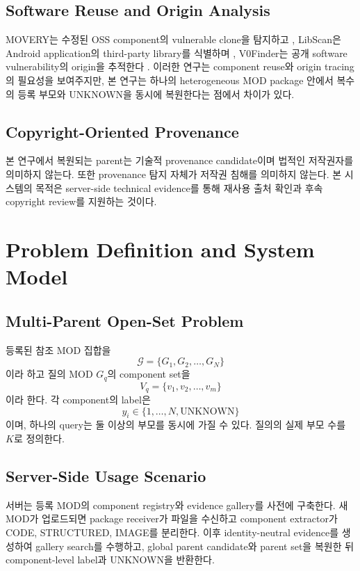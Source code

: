 \documentclass[runningheads]{llncs}
\begin{document}
\subsection{Software Reuse and Origin Analysis}

MOVERY는 수정된 OSS component의 vulnerable clone을 탐지하고
\cite{movery}, LibScan은 Android application의 third-party library를
식별하며 \cite{libscan}, V0Finder는 공개 software vulnerability의 origin을
추적한다 \cite{v0finder}. 이러한 연구는 component reuse와 origin tracing의
필요성을 보여주지만, 본 연구는 하나의 heterogeneous MOD package 안에서
복수의 등록 부모와 UNKNOWN을 동시에 복원한다는 점에서 차이가 있다.

\subsection{Copyright-Oriented Provenance}

본 연구에서 복원되는 parent는 기술적 provenance candidate이며 법적인
저작권자를 의미하지 않는다. 또한 provenance 탐지 자체가 저작권 침해를
의미하지 않는다. 본 시스템의 목적은 server-side technical evidence를 통해
재사용 출처 확인과 후속 copyright review를 지원하는 것이다.

\section{Problem Definition and System Model}

\subsection{Multi-Parent Open-Set Problem}

등록된 참조 MOD 집합을
\[
\mathcal{G}=\{G_1,G_2,\ldots,G_N\}
\]
이라 하고 질의 MOD $G_q$의 component set을
\[
V_q=\{v_1,v_2,\ldots,v_m\}
\]
이라 한다. 각 component의 label은
\[
y_i\in\{1,\ldots,N,\mathrm{UNKNOWN}\}
\]
이며, 하나의 query는 둘 이상의 부모를 동시에 가질 수 있다. 질의의 실제
부모 수를 $K$로 정의한다.

\subsection{Server-Side Usage Scenario}

서버는 등록 MOD의 component registry와 evidence gallery를 사전에 구축한다.
새 MOD가 업로드되면 package receiver가 파일을 수신하고 component extractor가
CODE, STRUCTURED, IMAGE를 분리한다. 이후 identity-neutral evidence를 생성하여
gallery search를 수행하고, global parent candidate와 parent set을 복원한 뒤
component-level label과 UNKNOWN을 반환한다.
\end{document}
